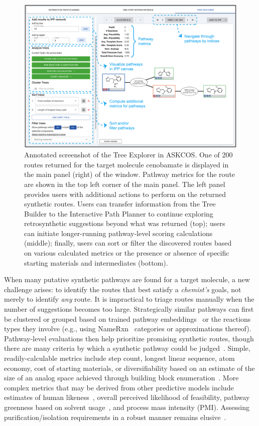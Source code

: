 \documentclass[pdflatex,sn-mathphys-num]{sn-jnl}%
\theoremstyle{thmstyleone}%
\theoremstyle{thmstyletwo}%
\theoremstyle{thmstylethree}%
\begin{document}
\begin{figure}[h!]
\centering
\includegraphics[width=1.0\textwidth]{media/4.TreeExplorer.png}
\caption{Annotated screenshot of the Tree Explorer in ASKCOS. One of 200 routes returned for the target molecule cenobamate is displayed in the main panel (right) of the window. Pathway metrics for the route are shown in the top left corner of the main panel. The left panel provides users with additional actions to perform on the returned synthetic routes. Users can transfer information from the Tree Builder to the Interactive Path Planner to continue exploring retrosynthetic suggestions beyond what was returned (top); users can initiate longer-running pathway-level scoring calculations (middle); finally, users can sort or filter the discovered routes based on various calculated metrics or the presence or absence of specific starting materials and intermediates (bottom). }\label{fig_tree_explorer}
\end{figure}

When many putative synthetic pathways are found for a target molecule, a new challenge arises: to identify the routes that best satisfy a \emph{chemist's }goals, not merely to identify \emph{any} route. It is impractical to triage routes manually when the number of suggestions becomes too large. Strategically similar pathways can first be clustered or grouped based on trained pathway embeddings~\citep{mo_evaluating_2021} or the reactions types they involve (e.g., using NameRxn~\citep{NameRXN} categories or approximations thereof). Pathway-level evaluations then help prioritize promising synthetic routes, though there are many criteria by which a synthetic pathway could be judged~\citep{hoffmann_ranking_2009}. Simple, readily-calculable metrics include step count, longest linear sequence, atom economy, cost of starting materials, or diversifiability based on an estimate of the size of an analog space achieved through building block enumeration~\citep{levin_computer-aided_2023}. More complex metrics that may be derived from other predictive models include estimates of human likeness~\citep{mo_evaluating_2021}, overall perceived likelihood of feasibility, pathway greenness based on solvent usage~\citep{wang_towards_2020}, and process mass intensity (PMI). Assessing purification/isolation requirements in a robust manner remains elusive~\citep{kuznetsov_extractionscore_2021}.
\end{document}
